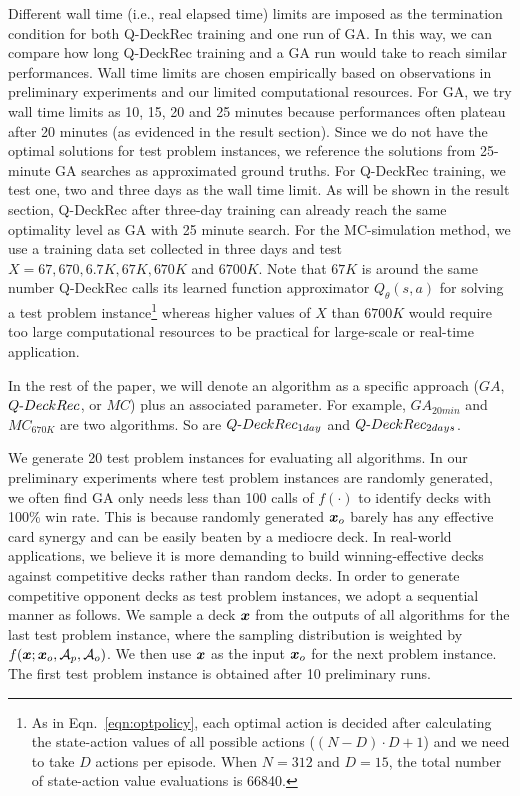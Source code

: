 Different wall time (i.e., real elapsed time) limits are imposed as the termination condition for both Q-DeckRec training and one run of GA. In this way, we can compare how long Q-DeckRec training and a GA run would take to reach similar performances. Wall time limits are chosen empirically based on observations in preliminary experiments and our limited computational resources. For GA, we try wall time limits as 10, 15, 20 and 25 minutes because performances often plateau after 20 minutes (as evidenced in the result section). Since we do not have the optimal solutions for test problem instances, we reference the solutions from 25-minute GA searches as approximated ground truths. For Q-DeckRec training, we test one, two and three days as the wall time limit. As will be shown in the result section, Q-DeckRec after three-day training can already reach the same optimality level as GA with 25 minute search. For the MC-simulation method, we use a training data set collected in three days and test ${X=67, 670, 6.7K, 67K, 670K}$ and $6700K$. Note that $67K$ is around the same number Q-DeckRec calls its learned function approximator $Q_\theta(s,a)$ for solving a test problem instance\footnote{As in Eqn.~\ref{eqn:optpolicy}, each optimal action is decided after calculating the state-action values of all possible actions ($(N-D)\cdot D + 1$) and we need to take $D$ actions per episode. When $N=312$ and $D=15$, the total number of state-action value evaluations is 66840.} whereas higher values of $X$ than $6700K$ would require too large computational resources to be practical for large-scale or real-time application. 

In the rest of the paper, we will denote an algorithm as a specific approach ($GA$, $Q\textnormal{-}DeckRec$, or $MC$) plus an associated parameter. For example, $GA_{20min}$ and $MC_{670K}$ are two algorithms. So are $Q\textnormal{-}DeckRec_{1day}$ and $Q\textnormal{-}DeckRec_{2days}$.   

We generate 20 test problem instances for evaluating all algorithms. In our preliminary experiments where test problem instances are randomly generated, we often find GA only needs less than 100 calls of $f(\cdot)$ to identify decks with 100\% win rate. This is because randomly generated $\boldsymbol{x}_o$ barely has any effective card synergy and can be easily beaten by a mediocre deck. In real-world applications, we believe it is more demanding to build winning-effective decks against competitive decks rather than random decks. In order to generate competitive opponent decks as test problem instances, we adopt a sequential manner as follows. We sample a deck $\boldsymbol{x}$ from the outputs of all algorithms for the last test problem instance, where the sampling distribution is weighted by $f(\boldsymbol{x};\boldsymbol{x}_o, \mathcal{A}_p, \mathcal{A}_o)$. We then use $\boldsymbol{x}$ as the input $\boldsymbol{x}_o$ for the next problem instance. The first test problem instance is obtained after 10 preliminary runs. 
    

